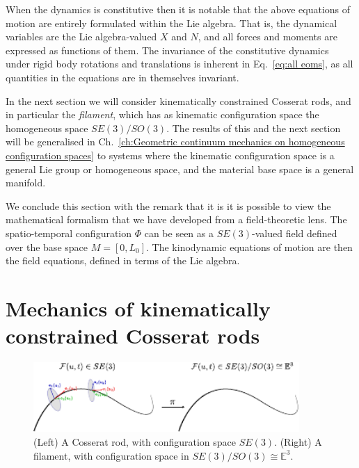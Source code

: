 When the dynamics is constitutive then it is notable that the above equations of motion are entirely formulated within the Lie algebra. That is, the dynamical variables are the Lie algebra-valued $X$ and $N$, and all forces and moments are expressed as functions of them. The invariance of the constitutive dynamics under rigid body rotations and translations is inherent in Eq.~\ref{eq:all eoms}, as all quantities in the equations are in themselves invariant.

In the next section we will consider kinematically constrained Cosserat rods, and in particular the \textit{filament}, which has as kinematic configuration space the homogeneous space $SE(3)/SO(3)$. The results of this and the next section will be generalised in Ch.~\ref{ch:Geometric continuum mechanics on homogeneous configuration spaces} to systems where the kinematic configuration space is a general Lie group or homogeneous space, and the material base space is a general manifold.

We conclude this section with the remark that it is it is possible to view the mathematical formalism that we have developed from a field-theoretic lens. The spatio-temporal configuration $\Phi$ can be seen as a $SE(3)$-valued field defined over the base space $M = [0, L_0]$. The kinodynamic equations of motion are then the field equations, defined in terms of the Lie algebra.


\section{Mechanics of kinematically constrained Cosserat rods} \label{sec:Mechanics of kinematically constrained Cosserat rods}

\begin{figure}[t]
\centering
        \includegraphics[width=0.9\textwidth]{figs_part2/sec7.5_kinematically_constrained_cosserat_rods/cosserat_rod_to_filament.pdf}
        \caption{(Left) A Cosserat rod, with configuration space $SE(3)$. (Right) A filament, with configuration space in $SE(3)/SO(3) \cong \mathbb{E}^3$.}
        \label{fig:cosserat rod and filament}
\end{figure}

